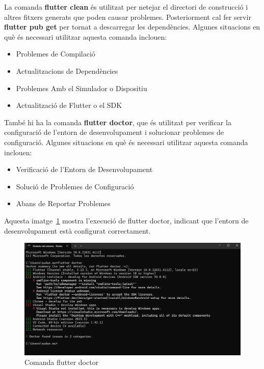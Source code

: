 \documentclass[a4paper,12pt,twoside]{ThesisStyle}
\begin{document}
La comanda \textbf{flutter clean} és utilitzat per netejar el directori de construcció i altres fitxers generats que poden causar problemes. Posteriorment cal fer servir \textbf{flutter pub get} per tornat a descarregar les dependències. Algunes situacions en què és necessari utilitzar aquesta comanda inclouen:

\begin{itemize}
  \item Problemes de Compilació
  \item Actualitzacions de Dependències
  \item Problemes Amb el Simulador o Dispositiu
  \item Actualització de Flutter o el SDK
\end{itemize}

També hi ha la comanda \textbf{flutter doctor}, que és utilitzat per verificar la configuració de l'entorn de desenvolupament i solucionar problemes de configuració. Algunes situacions en què és necessari utilitzar aquesta comanda inclouen:

\begin{itemize}
  \item Verificació de l'Entorn de Desenvolupament
  \item Solució de Problemes de Configuració
  \item Abans de Reportar Problemes 
\end{itemize}

Aquesta imatge~\ref{fig: Comanda flutter doctor} mostra l'execució de flutter doctor, indicant que l'entorn de desenvolupament està configurat correctament.
\begin{figure}[h]
    \centering
    \includegraphics[width=1\textwidth]{imatges/flutterdoctor.png}
    \caption{Comanda flutter doctor}
    \label{fig: Comanda flutter doctor}
\end{figure}
\end{document}
